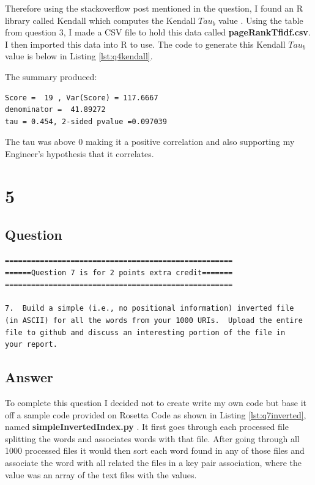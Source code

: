 \documentclass[letterpaper,11pt]{article}
\newcommand*{\srcPath}{../src}%
\begin{document}
Therefore using the stackoverflow post mentioned in the question, I found an R library called Kendall which computes the Kendall $Tau_b$ value \cite{stackoverflowpostref}. Using the table from question 3, I made a CSV file to hold this data called \textbf{pageRankTfidf.csv}. I then imported this data into R to use. The code to generate this Kendall $Tau_b$ value is below in Listing \ref{lst:q4kendall}.



The summary produced:
\begin{verbatim}
Score =  19 , Var(Score) = 117.6667
denominator =  41.89272
tau = 0.454, 2-sided pvalue =0.097039
\end{verbatim}

The tau was above 0 making it a positive correlation and also supporting my Engineer's hypothesis that it correlates.


\clearpage
\section*{5}

\subsection*{Question}

\begin{verbatim}
====================================================
======Question 7 is for 2 points extra credit=======
====================================================

7.  Build a simple (i.e., no positional information) inverted file
(in ASCII) for all the words from your 1000 URIs.  Upload the entire
file to github and discuss an interesting portion of the file in
your report.
\end{verbatim}

\clearpage
\subsection*{Answer}

To complete this question I decided not to create write my own code but base it off a sample code provided on Rosetta Code as shown in Listing \ref{lst:q7inverted}, named \textbf{simpleInvertedIndex.py} \cite{invertedindexref}. It first goes through each processed file splitting the words and associates words with that file. After going through all 1000 processed files it would then sort each word found in any of those files and associate the word with all related the files in a key pair association, where the value was an array of the text files with the values.
\end{document}

